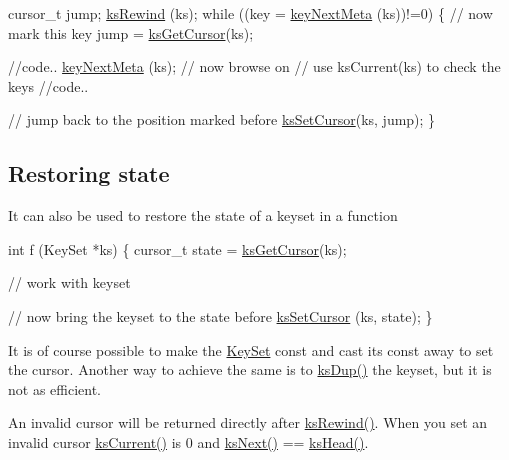 \begin{DoxyCode}
cursor\_t jump;
\hyperlink{group__keyset_gabe793ff51f1728e3429c84a8a9086b70}{ksRewind} (ks);
\textcolor{keywordflow}{while} ((key = \hyperlink{group__keymeta_ga4c88342f580a4291455a801af71ce048}{keyNextMeta} (ks))!=0)
\{
        \textcolor{comment}{// now mark this key}
        jump = \hyperlink{group__keyset_gaffe507ab9281c322eb16c3e992075d29}{ksGetCursor}(ks);

        \textcolor{comment}{//code..}
        \hyperlink{group__keymeta_ga4c88342f580a4291455a801af71ce048}{keyNextMeta} (ks); \textcolor{comment}{// now browse on}
        \textcolor{comment}{// use ksCurrent(ks) to check the keys}
        \textcolor{comment}{//code..}

        \textcolor{comment}{// jump back to the position marked before}
        \hyperlink{group__keyset_gad94c9ffaa3e8034564c0712fd407c345}{ksSetCursor}(ks, jump);
\}
\end{DoxyCode}
\hypertarget{group__keyset_restore}{}\subsection{Restoring state}\label{group__keyset_restore}
It can also be used to restore the state of a keyset in a function


\begin{DoxyCode}
\textcolor{keywordtype}{int} f (KeySet *ks)
\{
        cursor\_t state = \hyperlink{group__keyset_gaffe507ab9281c322eb16c3e992075d29}{ksGetCursor}(ks);

        \textcolor{comment}{// work with keyset}

        \textcolor{comment}{// now bring the keyset to the state before}
        \hyperlink{group__keyset_gad94c9ffaa3e8034564c0712fd407c345}{ksSetCursor} (ks, state);
\}
\end{DoxyCode}


It is of course possible to make the \hyperlink{classkdb_1_1KeySet}{Key\+Set} const and cast its const away to set the cursor. Another way to achieve the same is to \hyperlink{group__keyset_gac59e4b328245463f1451f68d5106151c}{ks\+Dup()} the keyset, but it is not as efficient.

An invalid cursor will be returned directly after \hyperlink{group__keyset_gabe793ff51f1728e3429c84a8a9086b70}{ks\+Rewind()}. When you set an invalid cursor \hyperlink{group__keyset_ga4287b9416912c5f2ab9c195cb74fb094}{ks\+Current()} is 0 and \hyperlink{group__keyset_ga317321c9065b5a4b3e33fe1c399bcec9}{ks\+Next()} == \hyperlink{group__keyset_gae7dbf3aef70e67b5328475eb3d1f92f5}{ks\+Head()}.


